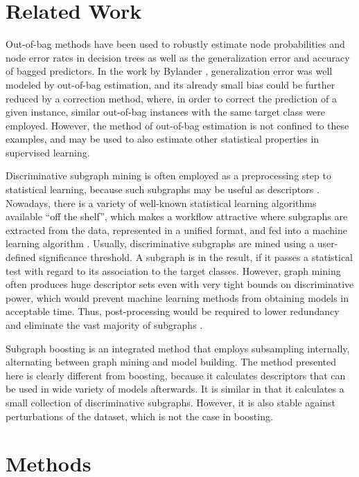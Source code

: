 \documentclass{sig-alternate}
\begin{document}
\section{Related Work}
\label{s:relatedWork}

Out-of-bag methods have been used to robustly estimate node probabilities and
node error rates in decision trees \cite{breiman96oob} as well as the
generalization error and accuracy of bagged predictors. In the work by Bylander
\cite{bylander02estimating}, generalization error was well modeled by
out-of-bag estimation, and its already small bias could be further reduced by a
correction method, where, in order to correct the prediction of a given
instance, similar out-of-bag instances with the same target class were
employed. However, the method of out-of-bag estimation is not confined to these
examples, and may be used to also estimate other statistical properties in
supervised learning.

Discriminative subgraph mining is often employed as a preprocessing step to
statistical learning, because such subgraphs may be useful as descriptors
\cite{bringmann10lego}. Nowadays, there is a variety of well-known statistical
learning algorithms available ``off the shelf'', which makes a workflow
attractive where subgraphs are extracted from the data, represented in a
unified format, and fed into a machine learning algorithm \cite{hkr03molfea}.
Usually, discriminative subgraphs are mined using a user-defined significance
threshold. A subgraph is in the result, if it passes a statistical test with
regard to its association to the target classes.  However, graph mining often
produces huge descriptor sets even with very tight bounds on discriminative
power, which would prevent machine learning methods from obtaining models in
acceptable time.  Thus, post-processing would be
required to lower redundancy and eliminate the vast majority of subgraphs
\cite{Hasan_origami:mining,Jun04Spin}. 

Subgraph boosting \cite{saigo09gboost} is an integrated method that employs
subsampling internally, alternating between graph mining and model building.
The method presented here is clearly different from boosting, because it
calculates descriptors that can be used in wide variety of models afterwards.
It is similar in that it calculates a small collection of discriminative
subgraphs. However, it is also stable against perturbations of the
dataset, which is not the case in boosting.


\section{Methods}
\label{s:Methods}
\end{document}
